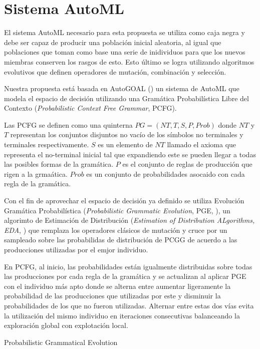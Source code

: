 \section{Sistema AutoML}
El sistema AutoML necesario para esta propuesta se utiliza como caja negra y debe ser capaz de producir una poblaci\'on inicial aleatoria, al igual que poblaciones que toman como base una serie de inidividuos para que los nuevos miembras conserven los rasgos de esto. Esto \'ultimo se logra utilizando algoritmos evolutivos que definen operadores de mutaci\'on, combinaci\'on y selecci\'on.

Nuestra propuesta est\'a basada en AutoGOAL (\cite{estevez2020solving}) un sistema de AutoML que modela el espacio de decisi\'on utilizando una Gram\'atica Probabil\'istica  Libre del Contexto (\textit{Probabilistic Context Free Grammar}, PCFG). 

Las PCFG se definen como una quinterna $PG = (NT, T, S, P, Prob)$ donde $NT$ y $T$ representan los conjuntos disjuntos no vac\'io de los s\'imbolos no terminales y terminales respectivamente. $S$ es un elemento de $NT$ llamado el axioma que representa el no-terminal inicial tal que expandiendo este se pueden llegar a todas las posibles formas de la gram\'atica. $P$ es el conjunto de reglas de producci\'on que rigen a la grma\'atica. $Prob$  es un conjunto de probabilidades asocaido con cada regla de la gram\'atica. 

Con el fin de aprovechar el espacio de decisi\'on ya definido se utiliza Evoluci\'on Gram\'atica Probabil\'istica (\textit{Probabilistic Grammatic Evolution}, PGE, \cite{megane2021probabilistic}), un algorimto de Estimaci\'on de Distribuci\'on (\textit{Estimation of Distribution ALgorithms, EDA}, \cite{larranaga2001estimation}) que remplaza los operadores cl\'asicos de mutaci\'on y cruce por un sampleado sobre las probabilidas de distribuci\'on de PCGG de acuerdo a las producciones utilizadas por el emjor individuo.

En PCFG, al inicio, las probabilidades est\'an igualmente distribuidas sobre todas las producciones por cada regla de la gram\'atica y se actualizan al aplicar PGE con el individuo m\'as apto donde se alterna entre aumentar ligeramente la probabilidad de las producciones que utilizadas por este y disminuir la probabilidades de los que no fueron utilizadas. Alternar entre estas dos v\'ias evita la utilizaci\'on del mismo individuo en iteraciones consecutivas balanceando la exploraci\'on global con explotaci\'on local.

\begin{algorithm}[H]\caption{Probabilistic Grammatical Evolution}
\end{algorithm}

